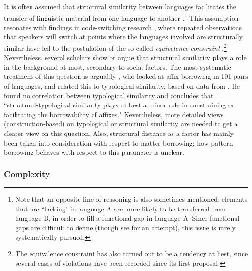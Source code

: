 \documentclass[output=paper,
modfonts
]{langscibook}
\begin{document}
\noindent It is often assumed that structural similarity between languages facilitates the transfer of linguistic material from one language to another \parencite[see e.g.][and references therein]{bowern2013relatedness, seifart2015does}.\footnote{Note that an opposite line of reasoning is also sometimes mentioned: elements that are ``lacking" in language A are more likely to be transferred from language B, in order to fill a functional gap in language A. Since functional gaps are difficult to define (though see \textcite{hale1975gaps} for an attempt), this issue is rarely systematically pursued.} This assumption resonates with findings in code-switching research
, where repeated observations that speakers will switch at points where the languages involved are structurally similar have led to the postulation of the so-called \textit{equivalence constraint} \parencite{poplack1978dialect,poplack1980sometimes}.\footnote{The equivalence constraint has also turned out to be a tendency at best, since several cases of violations have been recorded since its first proposal \parencite[130]{matras2010language}} Nevertheless, several scholars \parencite{thomasonetal1988language,bowern2013relatedness, seifart2015does} show or argue that structural similarity plays a role in the background at most, secondary to social factors. The most systematic treatment of this question is arguably \textcite{seifart2015does}, who looked at affix borrowing in 101 pairs of languages, and related this to typological similarity, based on data from \textcite{wals}. He found no correlation between typological similarity and concludes that ``structural-typological similarity plays at best a minor role in constraining or facilitating the borrowability of affixes." Nevertheless, more detailed views (construction-based) on typological or structural similarity are needed to get a clearer view on this question. Also, structural distance as a factor has mainly been taken into consideration with respect to matter borrowing; how pattern borrowing behaves with respect to this parameter is unclear.\\

\subsubsection{Complexity}
\end{document}
